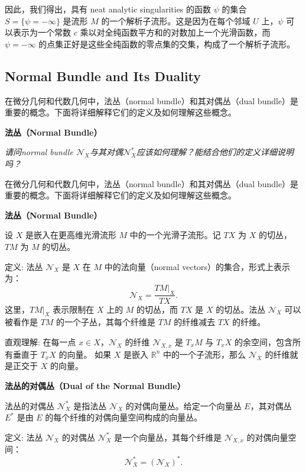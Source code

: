 \documentclass[lang=cn,12pt,fontset=none,a4paper]{beautybook}
\begin{document}
因此，我们得出，具有 {\rodondo neat analytic singularities} 的函数 \(\psi\) 的集合 \( S = \{ \psi = -\infty \} \) 是流形 \(M\) 的一个解析子流形。这是因为在每个邻域 \(U\) 上，\(\psi\) 可以表示为一个常数 \(c\) 乘以对全纯函数平方和的对数加上一个光滑函数，而 \(\psi = -\infty\) 的点集正好是这些全纯函数的零点集的交集，构成了一个解析子流形。

\subsection{Normal Bundle and Its Duality}

在微分几何和代数几何中，法丛（{\mont normal bundle}）和其对偶丛（{\cabin dual bundle}）是重要的概念。下面将详细解释它们的定义及如何理解这些概念。

\textbf{法丛（Normal Bundle）}

\textit{请问normal bundle $\mathcal{N}_X$与其对偶$\mathcal{N}_X^*$应该如何理解？能结合他们的定义详细说明吗？}


在微分几何和代数几何中，法丛（normal bundle）和其对偶丛（dual bundle）是重要的概念。下面将详细解释它们的定义及如何理解这些概念。

\textbf{法丛（Normal Bundle）}

设 \( X \) 是嵌入在更高维光滑流形 \( M \) 中的一个光滑子流形。记 \( TX \) 为 \( X \) 的切丛，\( TM \) 为 \( M \) 的切丛。

定义: 法丛 \( \mathcal{N}_X \) 是 \( X \) 在 \( M \) 中的法向量（normal vectors）的集合，形式上表示为：
\[
\mathcal{N}_X = \frac{TM|_X}{TX}.
\]
这里，\( TM|_X \) 表示限制在 \( X \) 上的 \( M \) 的切丛，而 \( TX \) 是 \( X \) 的切丛。法丛 \( \mathcal{N}_X \) 可以被看作是 \( TM \) 的一个子丛，其每个纤维是 \( TM \) 的纤维减去 \( TX \) 的纤维。

直观理解:
在每一点 \( x \in X \)，\( \mathcal{N}_X \) 的纤维 \( \mathcal{N}_{X,x} \) 是 \( T_x M \) 与 \( T_x X \) 的余空间，包含所有垂直于 \( T_x X \) 的向量。
如果 \( X \) 是嵌入 \( \mathbb{R}^n \) 中的一个子流形，那么 \( \mathcal{N}_X \) 的纤维就是正交于 \( X \) 的向量。

\textbf{法丛的对偶丛（Dual of the Normal Bundle）}

法丛的对偶丛 \( \mathcal{N}_X^* \) 是指法丛 \( \mathcal{N}_X \) 的对偶向量丛。给定一个向量丛 \( E \)，其对偶丛 \( E^* \) 是由 \( E \) 的每个纤维的对偶向量空间构成的向量丛。

定义: 法丛 \( \mathcal{N}_X \) 的对偶丛 \( \mathcal{N}_X^* \) 是一个向量丛，其每个纤维是 \( \mathcal{N}_{X,x} \) 的对偶向量空间：
\[
\mathcal{N}_X^* = (\mathcal{N}_X)^*.
\]
\end{document}
